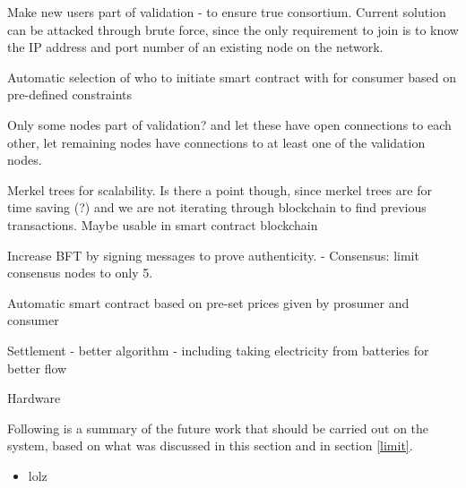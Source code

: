 Make new users part of validation - to ensure true consortium. Current solution can be attacked through brute force, since the only requirement to join is to know the IP address and port number of an existing node on the network.

Automatic selection of who to initiate smart contract with for consumer based on pre-defined constraints 

Only some nodes part of validation? and let these have open connections to each other, let remaining nodes have connections to at least one of the validation nodes. 

Merkel trees for scalability. Is there a point though, since merkel trees are for time saving (?) and we are not iterating through blockchain to find previous transactions. Maybe usable in smart contract blockchain

Increase BFT by signing messages to prove authenticity.  -
Consensus: limit consensus nodes to only 5. 

Automatic smart contract based on pre-set prices given by prosumer and consumer

Settlement - better algorithm - including taking electricity from batteries for better flow

Hardware

Following is a summary of the future work that should be carried out on the system, based on what was discussed in this section and in section \ref{limit}.

\begin{itemize}
\item lolz
\end{itemize}